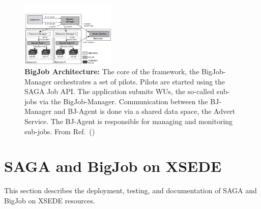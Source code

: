 \documentclass{sig-alternate}
\begin{document}



\begin{figure}[t]
  \centering
  \includegraphics[width=0.40\textwidth]{./figs/re_bigjob_interactions}
   \caption{\textbf{BigJob Architecture:} The core of the framework,
     the BigJob-Manager orchestrates a set of pilots. Pilots are
     started using the SAGA Job API. The application submits WUs, the
     so-called sub-jobs via the BigJob-Manager. Communication between
     the BJ-Manager and BJ-Agent is done via a shared data space, the
     Advert Service. The BJ-Agent is responsible for managing and
     monitoring sub-jobs. From Ref.~(\cite{saga_bigjob_condor_cloud})}
        \label{fig:figures_re_bigjob_interactions}
\end{figure}



\section{SAGA and BigJob on XSEDE}
This section describes the deployment, testing, and documentation of
SAGA and BigJob on XSEDE resources.
\end{document}
